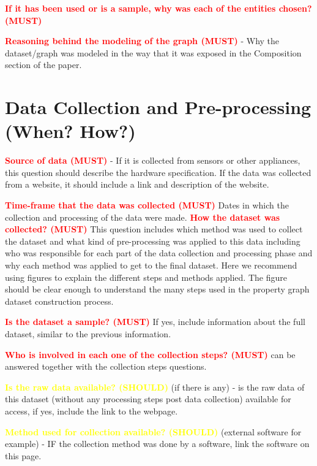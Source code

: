 \documentclass[letterpaper,11pt]{article}
\begin{document}
\textbf{\textcolor{red}{If it has been used or is a sample, why was each of the entities chosen? (MUST)}}


\textbf{\textcolor{red}{Reasoning behind the modeling of the graph (MUST)}} - Why the dataset/graph was modeled in the way that it was exposed in the Composition section of the paper. 

\section{Data Collection and Pre-processing (When? How?)}

\textbf{\textcolor{red}{Source of data (MUST)}} - If it is collected from sensors or other appliances, this question should describe the hardware specification. If the data was collected from a website, it should include a link and description of the website. %

\textbf{\textcolor{red}{Time-frame that the data was collected (MUST)}} Dates in which the collection and processing of the data were made.
\textbf{\textcolor{red}{How the dataset was collected? (MUST)}} This question includes which method was used to collect the dataset and what kind of pre-processing was applied to this data including who was responsible for each part of the data collection and processing phase and why each method was applied to get to the final dataset. Here we recommend using figures to explain the different steps and methods applied. The figure should be clear enough to understand the many steps used in the property graph dataset construction process. %

\textbf{\textcolor{red}{Is the dataset a sample? (MUST)}} If yes, include information about the full dataset, similar to the previous information. %

\textbf{\textcolor{red}{Who is involved in each one of the collection steps? (MUST)}} can be answered together with the collection steps questions. 

\textbf{\textcolor{yellow}{Is the raw data available? (SHOULD)}} (if there is any) - is the raw data of this dataset (without any processing steps post data collection) available for access, if yes, include the link to the webpage. 

\textbf{\textcolor{yellow}{Method used for collection available? (SHOULD)}} (external software for example) - IF the collection method was done by a software, link the software on this page. 
\end{document}
